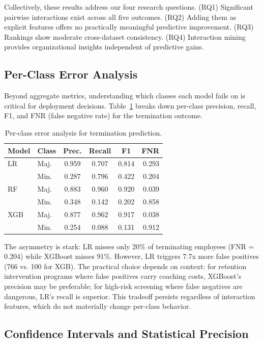 \documentclass[conference]{IEEEtran}
\begin{document}
Collectively, these results address our four research questions. (RQ1) Significant pairwise interactions exist across all five outcomes. (RQ2) Adding them as explicit features offers no practically meaningful predictive improvement. (RQ3) Rankings show moderate cross-dataset consistency. (RQ4) Interaction mining provides organizational insights independent of predictive gains.

\subsection{Per-Class Error Analysis}
\label{sec:error_analysis}

Beyond aggregate metrics, understanding which classes each model fails on is critical for deployment decisions. Table~\ref{tab:error_analysis} breaks down per-class precision, recall, F1, and FNR (false negative rate) for the termination outcome.

\begin{table}[htb]
\centering
\small
\renewcommand{\arraystretch}{1.15}
\caption{Per-class error analysis for termination prediction.}
\label{tab:error_analysis}
\begin{tabular}{llcccr}
\hline
Model & Class & Prec. & Recall & F1 & FNR \\
\hline
LR & Maj. & 0.959 & 0.707 & 0.814 & 0.293 \\
 & Min. & 0.287 & 0.796 & 0.422 & 0.204 \\
RF & Maj. & 0.883 & 0.960 & 0.920 & 0.039 \\
 & Min. & 0.348 & 0.142 & 0.202 & 0.858 \\
XGB & Maj. & 0.877 & 0.962 & 0.917 & 0.038 \\
 & Min. & 0.254 & 0.088 & 0.131 & 0.912 \\
\hline
\end{tabular}
\end{table}

The asymmetry is stark: LR misses only 20\% of terminating employees (FNR = 0.204) while XGBoost misses 91\%. However, LR triggers 7.7x more false positives (766 vs. 100 for XGB). The practical choice depends on context: for retention intervention programs where false positives carry coaching costs, XGBoost's precision may be preferable; for high-risk screening where false negatives are dangerous, LR's recall is superior. This tradeoff persists regardless of interaction features, which do not materially change per-class behavior.

\subsection{Confidence Intervals and Statistical Precision}
\end{document}
